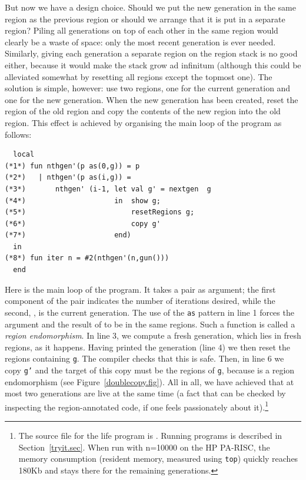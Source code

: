 \documentclass[12pt]{book}
\begin{document}
But now we have a design choice. Should we put the new generation in
the same region as the previous region or should we arrange that it is
put in a separate region? Piling all generations on top of each
other in the same region
would clearly be a waste of space: only the most recent generation is
ever needed. Similarly, giving each generation a separate region on the
region stack is no good either, because it would make the stack grow
ad infinitum (although this could be alleviated somewhat by resetting
all regions except the topmost one). The solution is simple, however:
use two regions, one for the current generation and one for the new
generation. When the new generation has been created, reset the region
of the old region and copy the contents of 
the new region into the old region. This effect is
achieved by organising the main loop of the program as follows:
\begin{verbatim}
  local 
(*1*) fun nthgen'(p as(0,g)) = p 
(*2*)   | nthgen'(p as(i,g)) = 
(*3*)       nthgen' (i-1, let val g' = nextgen  g
(*4*)                     in  show g;
(*5*)                         resetRegions g;
(*6*)                         copy g'
(*7*)                     end)
  in 
(*8*) fun iter n = #2(nthgen'(n,gun()))
  end
\end{verbatim}
Here  is the main loop of
the program. It takes a pair as argument; the first component of the
pair indicates the number of iterations desired, while the second,
, is the current generation. The use of the {\tt as} pattern
in line 1 forces the argument and the result of  to be
in the same regions. Such a function is called a 
%
{\em region endomorphism}. In line 3, we compute a fresh generation,
which lies in fresh regions, as it happens. Having printed the
generation (line 4) we then reset the regions containing {\tt g}. The
compiler checks that this is safe. Then, in line 6 we copy {\tt g'}
and the target of this copy must be the regions of {\tt g}, because
 is a region endomorphism (see
Figure~\ref{doublecopy.fig}).  All in all, we have achieved that at
most two generations are live at the same time (a fact that can be
checked by inspecting the region-annotated code, if one feels
passionately about it).\footnote{The source file for the life program
  is . Running programs
  is described in Section~\ref{tryit.sec}. When run with n=10000 on
  the HP PA-RISC, the memory consumption (resident memory, measured
  using {\tt top}) quickly reaches 180Kb and stays there for the
  remaining generations.}
\end{document}

